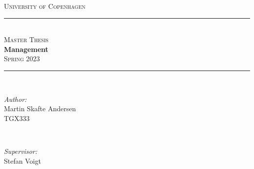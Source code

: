 \thispagestyle{empty}

\begin{titlepage}

\newcommand{\HRule}{\rule{\linewidth}{0.5mm}} %

\center %
 

\textsc{\LARGE University of Copenhagen}\\[1.5cm] %


\HRule \\[0.4cm]
\textsc{\Large Master Thesis}\\[0.5cm] 
{ \huge \bfseries Management}\\[0.4cm] %
\textsc{\Large Spring 2023}\\[0.5cm] 
\HRule \\[1.5cm]
 

\begin{minipage}{0.4\textwidth}
\begin{flushleft} \large
\emph{Author:}\\
Martin Skafte Andersen \\ TGX333 \\
\end{flushleft}
\end{minipage}
~
\begin{minipage}{0.4\textwidth}
\begin{flushright} \large
\emph{Supervisor:} \\
Stefan Voigt \\
\end{flushright}
\end{minipage}\\[5cm]
\begin{flushleft}
    

\end{flushleft}
\end{titlepage}
